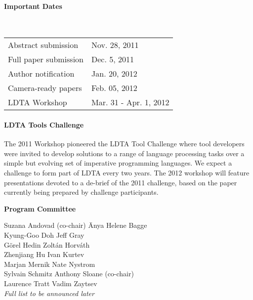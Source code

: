 \documentclass[letterpaper, twocolumn, 9pt]{article}
\begin{document}
\paragraph{\textsf{Important Dates}} ~

\vspace{5pt}
\hspace{-0.20in}
\begin{tabular}{ll}
Abstract submission & Nov. 28, 2011\\
Full paper submission & Dec. 5, 2011\\
Author notification & Jan. 20, 2012\\
Camera-ready papers & Feb. 05, 2012\\
LDTA Workshop & Mar. 31 - Apr. 1, 2012
\end{tabular}

\paragraph{\textsf{LDTA Tools Challenge}}
The 2011 Workshop pioneered the LDTA Tool Challenge where tool
developers were invited to develop solutions to a range of language
processing tasks over a simple but evolving set of imperative
programming languages. We expect a challenge to form part of LDTA
every two years. The 2012 workshop will feature presentations devoted
to a de-brief of the 2011 challenge, based on the paper currently
being prepared by challenge participants.

\newpage

\vspace{3pt}
\hspace{-0.20in}
{\bfseries\textsf{Program Committee}}\\
{\small
\vspace{-9pt}
\begin{tabbing}
 Suzana Andovad (co-chair) \hspace{1.25cm}\= Anya Helene Bagge\\
 Kyung-Goo Doh \> Jeff Gray\\
 Görel Hedin \> Zoltán Horváth\\
 Zhenjiang Hu \> Ivan Kurtev\\  
 Marjan Mernik \> Nate Nystrom\\
 Sylvain Schmitz \> Anthony Sloane (co-chair)\\
 Laurence Tratt \> Vadim Zaytsev \\
 \emph{Full list to be announced later}\\
\end{tabbing}
}
\end{document}

